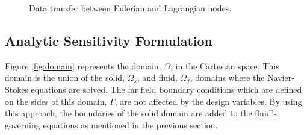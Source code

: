 \documentclass[12pt]{aiaa-pretty}
\begin{document}
%
\begin{figure}[H]
	\centering
	\quad
	\quad
	\caption{Data transfer between Eulerian and Lagrangian nodes.}
	\label{fig:mappingDataE2L}
\end{figure}
%

\subsection{Analytic Sensitivity Formulation}
Figure \ref{fig:domain} represents the domain, $\Omega$, in the Cartesian space. This domain is the union of the solid, $\Omega_s$, and fluid, $\Omega_f$, domains where the Navier-Stokes equations are solved. The far field boundary conditions which are defined on the sides of this domain, $\Gamma$, are not affected by the design variables. By using this approach, the boundaries of the solid domain are added to the fluid's governing equations as mentioned in the previous section.
\end{document}
